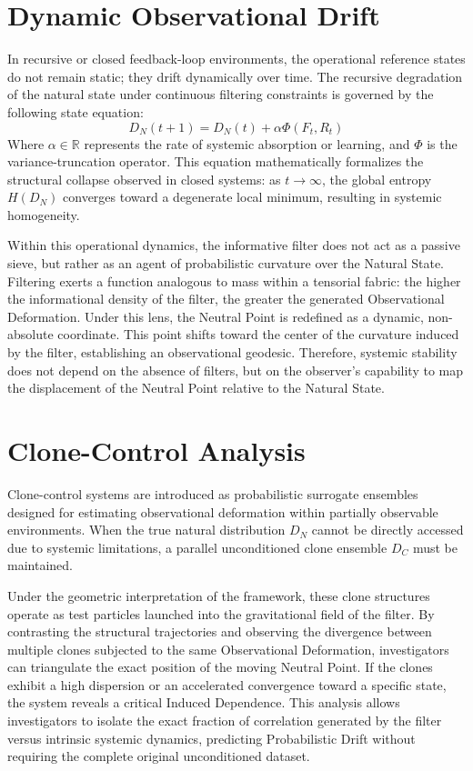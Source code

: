 \documentclass[11pt,twocolumn]{article}
\begin{document}
\section{Dynamic Observational Drift}
In recursive or closed feedback-loop environments, the operational reference states do not remain static; they drift dynamically over time. The recursive degradation of the natural state under continuous filtering constraints is governed by the following state equation:
\begin{equation}
D_N(t+1) = D_N(t) + \alpha \Phi(F_t, R_t)
\end{equation}
Where $\alpha \in \mathbb{R}$ represents the rate of systemic absorption or learning, and $\Phi$ is the variance-truncation operator. This equation mathematically formalizes the structural collapse observed in closed systems: as $t \to \infty$, the global entropy $H(D_N)$ converges toward a degenerate local minimum, resulting in systemic homogeneity.

Within this operational dynamics, the informative filter does not act as a passive sieve, but rather as an agent of probabilistic curvature over the Natural State. Filtering exerts a function analogous to mass within a tensorial fabric: the higher the informational density of the filter, the greater the generated Observational Deformation. Under this lens, the Neutral Point is redefined as a dynamic, non-absolute coordinate. This point shifts toward the center of the curvature induced by the filter, establishing an observational geodesic. Therefore, systemic stability does not depend on the absence of filters, but on the observer's capability to map the displacement of the Neutral Point relative to the Natural State.

\section{Clone-Control Analysis}
Clone-control systems are introduced as probabilistic surrogate ensembles designed for estimating observational deformation within partially observable environments. When the true natural distribution $D_N$ cannot be directly accessed due to systemic limitations, a parallel unconditioned clone ensemble $D_C$ must be maintained.

Under the geometric interpretation of the framework, these clone structures operate as test particles launched into the gravitational field of the filter. By contrasting the structural trajectories and observing the divergence between multiple clones subjected to the same Observational Deformation, investigators can triangulate the exact position of the moving Neutral Point. If the clones exhibit a high dispersion or an accelerated convergence toward a specific state, the system reveals a critical Induced Dependence. This analysis allows investigators to isolate the exact fraction of correlation generated by the filter versus intrinsic systemic dynamics, predicting Probabilistic Drift without requiring the complete original unconditioned dataset.
\end{document}
